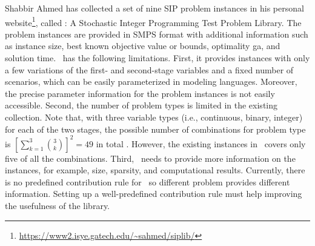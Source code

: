 Shabbir Ahmed has collected a set of nine SIP problem instances in his personal website\footnote{\url{https://www2.isye.gatech.edu/~sahmed/siplib/}}, called \siplib: A Stochastic Integer Programming Test Problem Library. The problem instances are provided in SMPS format \cite{smps} with additional information such as instance size, best known objective value or bounds, optimality ga, and solution time. \siplib\ has the following limitations. 
First, it provides instances with only a few variations of the first- and second-stage variables and a fixed number of scenarios, which can be easily parameterized in 
modeling languages. Moreover, the precise parameter information for the problem instances is 
not easily accessible. Second, the number of problem types is limited in 
the existing collection. Note that, with three variable types (i.e., continuous, 
binary, integer) for each of the two stages, the possible number of combinations for problem type is $\left[\sum_{k=1}
^3\binom{3}{k}\right]^2=49$ in total . 
\textcolor{NavyBlue}{However, the existing instances in \siplib\ covers only five of all the combinations.}
\textcolor{NavyBlue}{Third, \siplib\ needs to provide more information on the instances, for example, size, sparsity, and computational results. Currently, there is no predefined contribution rule for \siplib\ so different problem provides different information. Setting up a well-predefined contribution rule must help improving the usefulness of the library.} 


